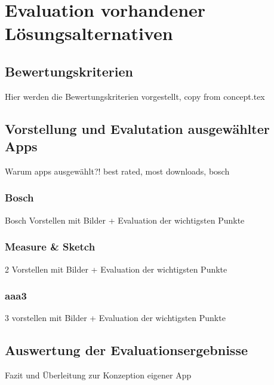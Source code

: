 \chapter{Evaluation vorhandener Lösungsalternativen}
\section{Bewertungskriterien}
Hier werden die Bewertungskriterien vorgestellt, copy from concept.tex

\section{Vorstellung und Evalutation ausgewählter Apps}
Warum apps ausgewählt?! best rated, most downloads, bosch

\subsection{Bosch}
Bosch Vorstellen mit Bilder + Evaluation der wichtigsten Punkte
\subsection{Measure \& Sketch}
2 Vorstellen mit Bilder + Evaluation der wichtigsten Punkte
\subsection{aaa3}
3 vorstellen mit Bilder + Evaluation der wichtigsten Punkte

\section{Auswertung der Evaluationsergebnisse}
Fazit und Überleitung zur Konzeption eigener App

